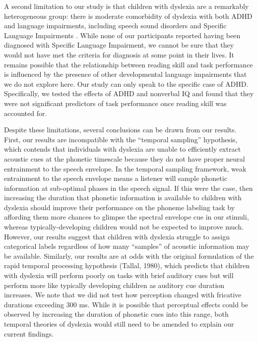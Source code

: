 \documentclass[../uwthesis.tex]{subfiles}
\begin{document}
A second limitation to our study is that children with dyslexia are a remarkably heterogeneous group: there is moderate comorbidity of dyslexia with both ADHD and language impairments, including speech sound disorders and Specific Language Impairments \cite{Germano2010ComorbidityDyslexia, Pennington2006FromDisorders,Stevenson2005AttentionGene}. While none of our participants reported having been diagnosed with Specific Language Impairment, we cannot be sure that they would not have met the criteria for diagnosis at some point in their lives. It remains possible that the relationship between reading skill and task performance is influenced by the presence of other developmental language impairments that we do not explore here. Our study can only speak to the specific case of ADHD. Specifically, we tested the effects of ADHD and nonverbal IQ and found that they were not significant predictors of task performance once reading skill was accounted for. 

Despite these limitations, several conclusions can be drawn from our results. First, our results are incompatible with the “temporal sampling” hypothesis, which contends that individuals with dyslexia are unable to efficiently extract acoustic cues at the phonetic timescale because they do not have proper neural entrainment to the speech envelope. In the temporal sampling framework, weak entrainment to the speech envelope means a listener will sample phonetic information at sub-optimal phases in the speech signal. If this were the case, then increasing the duration that phonetic information is available to children with dyslexia should improve their performance on the phoneme labeling task by affording them more chances to glimpse the spectral envelope cue in our stimuli, whereas typically-developing children would not be expected to improve much. However, our results suggest that children with dyslexia struggle to assign categorical labels regardless of how many “samples” of acoustic information may be available. Similarly, our results are at odds with the original formulation of the rapid temporal processing hypothesis (Tallal, 1980), which predicts that children with dyslexia will perform poorly on tasks with brief auditory cues but will perform more like typically developing children as auditory cue duration increases. We note that we did not test how perception changed with fricative durations exceeding 300 ms. While it is possible that perceptual effects could be observed by increasing the duration of phonetic cues into this range, both temporal theories of dyslexia \cite{Goswami2011ADyslexia,Tallal1996LanguageSpeech} would still need to be amended to explain our current findings. 
\end{document}
